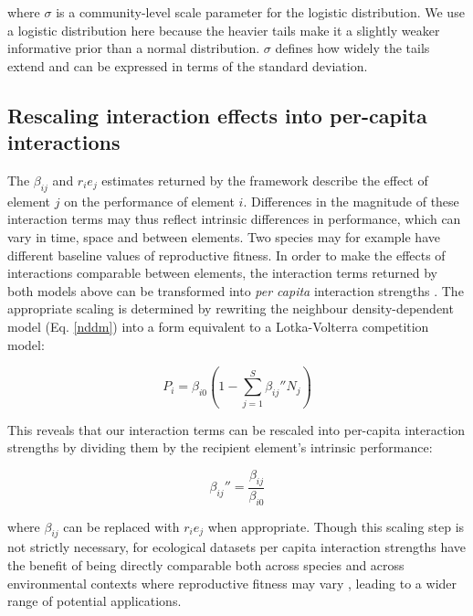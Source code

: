 \documentclass[a4,12pt]{article}
\begin{document}
        where $\sigma$ is a community-level scale parameter for the logistic distribution. We use a logistic distribution here because the heavier tails make it a slightly weaker informative prior than a normal distribution. $\sigma$ defines how widely the tails extend and can be expressed in terms of the standard deviation. 


    \subsection{Rescaling interaction effects into per-capita interactions}

        The $\beta_{ij}$ and $r_i e_j$ estimates returned by the framework describe the effect of element $j$ on the performance of element $i$. Differences in the magnitude of these interaction terms may thus reflect intrinsic differences in performance, which can vary in time, space and between elements. Two species may for example have different baseline values of reproductive fitness. In order to make the effects of interactions comparable between elements, the interaction terms returned by both models above can be transformed into \textit{per capita} interaction strengths \parencite{Laska1998}. The appropriate scaling is determined by rewriting the neighbour density-dependent model (Eq. \ref{nddm}) into a form equivalent to a Lotka-Volterra competition model: 

        \begin{equation}
        P_{i} = \beta_{i0} \left ( 1 - \sum_{j=1}^{S} {\beta_{ij}}'' N_{j} \right )
        \label{LVform}
        \end{equation}

        This reveals that our interaction terms can be rescaled into per-capita interaction strengths by dividing them by the recipient element's intrinsic performance:  

        \begin{equation}
        {\beta_{ij}}'' = \frac{\beta_{ij}}{\beta_{i0}}
        \label{scaling}
        \end{equation}

        where $\beta_{ij}$ can be replaced with $r_i e_j$ when appropriate. Though this scaling step is not strictly necessary, for ecological datasets per capita interaction strengths have the benefit of being directly comparable both across species and across environmental contexts where reproductive fitness may vary \parencite{Wootton2005}, leading to a wider range of potential applications.
\end{document}
